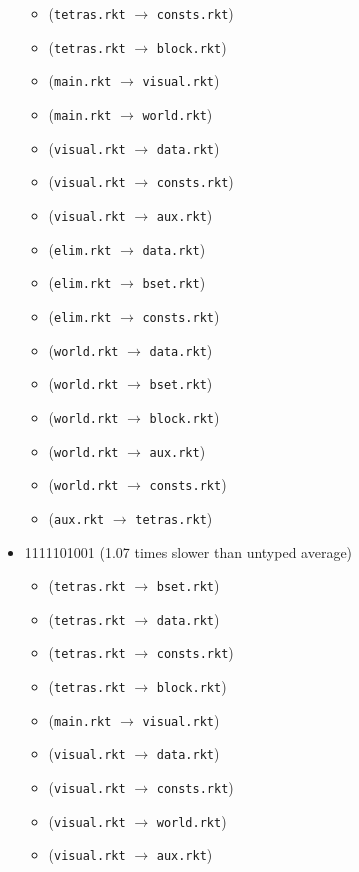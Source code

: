 \documentclass{article}
\newcommand{\mono}[1]{\texttt{#1}}
\begin{document}
\begin{itemize}
\begin{itemize}
  \item (\mono{tetras.rkt} $\rightarrow$ \mono{consts.rkt})
  \item (\mono{tetras.rkt} $\rightarrow$ \mono{block.rkt})
  \item (\mono{main.rkt} $\rightarrow$ \mono{visual.rkt})
  \item (\mono{main.rkt} $\rightarrow$ \mono{world.rkt})
  \item (\mono{visual.rkt} $\rightarrow$ \mono{data.rkt})
  \item (\mono{visual.rkt} $\rightarrow$ \mono{consts.rkt})
  \item (\mono{visual.rkt} $\rightarrow$ \mono{aux.rkt})
  \item (\mono{elim.rkt} $\rightarrow$ \mono{data.rkt})
  \item (\mono{elim.rkt} $\rightarrow$ \mono{bset.rkt})
  \item (\mono{elim.rkt} $\rightarrow$ \mono{consts.rkt})
  \item (\mono{world.rkt} $\rightarrow$ \mono{data.rkt})
  \item (\mono{world.rkt} $\rightarrow$ \mono{bset.rkt})
  \item (\mono{world.rkt} $\rightarrow$ \mono{block.rkt})
  \item (\mono{world.rkt} $\rightarrow$ \mono{aux.rkt})
  \item (\mono{world.rkt} $\rightarrow$ \mono{consts.rkt})
  \item (\mono{aux.rkt} $\rightarrow$ \mono{tetras.rkt})
  \end{itemize}
\item 1111101001 (1.07 times slower than untyped average)
  \begin{itemize}
  \item (\mono{tetras.rkt} $\rightarrow$ \mono{bset.rkt})
  \item (\mono{tetras.rkt} $\rightarrow$ \mono{data.rkt})
  \item (\mono{tetras.rkt} $\rightarrow$ \mono{consts.rkt})
  \item (\mono{tetras.rkt} $\rightarrow$ \mono{block.rkt})
  \item (\mono{main.rkt} $\rightarrow$ \mono{visual.rkt})
  \item (\mono{visual.rkt} $\rightarrow$ \mono{data.rkt})
  \item (\mono{visual.rkt} $\rightarrow$ \mono{consts.rkt})
  \item (\mono{visual.rkt} $\rightarrow$ \mono{world.rkt})
  \item (\mono{visual.rkt} $\rightarrow$ \mono{aux.rkt})

\end{itemize}
\end{itemize}
\end{document}
